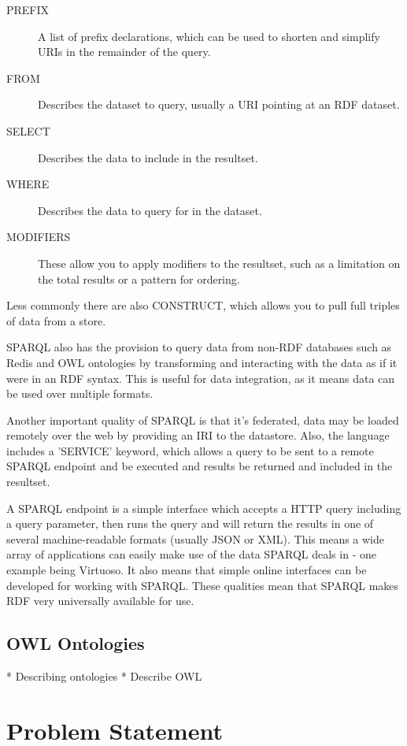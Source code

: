 \documentclass{article}
\begin{document}
\begin{description}
    \item[PREFIX] A list of prefix declarations, which can be used to shorten
    and simplify URIs in the remainder of the query.
    \item[FROM] Describes the dataset to query, usually a URI pointing at an RDF
    dataset.
    \item[SELECT] Describes the data to include in the resultset.
    \item[WHERE] Describes the data to query for in the dataset.
    \item[MODIFIERS] These allow you to apply modifiers to the resultset, such
    as a limitation on the total results or a pattern for ordering.
\end{description}

Less commonly there are also CONSTRUCT, which allows you to pull full triples of
data from a store.

SPARQL also has the provision to query data from non-RDF databases such as Redis
and OWL ontologies by transforming and interacting with the data as if it were
in an RDF syntax. This is useful for data integration, as it means data can be
used over multiple formats. 

Another important quality of SPARQL is that it's federated, data may be loaded
remotely over the web by providing an IRI to the datastore. Also, the language
includes a 'SERVICE' keyword, which allows a query to be sent to a remote SPARQL
endpoint and be executed and results be returned and included in the resultset.

A SPARQL endpoint is a simple interface which accepts a HTTP query including a
query parameter, then runs the query and will return the results in one of 
several machine-readable formats (usually JSON or XML). This means a wide array
of applications can easily make use of the data SPARQL deals in - one example
being Virtuoso. It also means that simple online interfaces can be developed for 
working with SPARQL. These qualities mean that SPARQL makes RDF very universally
available for use.

\subsection{OWL Ontologies}

* Describing ontologies
* Describe OWL

\section{Problem Statement}
\end{document}
